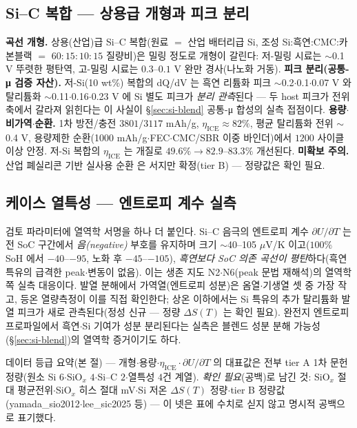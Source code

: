 \subsection{Si--C 복합 --- 상용급 개형과 피크 분리}\label{ssec:si-sic}
\textbf{곡선 개형.} 상용(산업)급 Si--C 복합(원료 $=$ 산업 배터리급 Si, 조성 Si:흑연:CMC:카본블랙 $=$
$60{:}15{:}10{:}15$ 질량비)은 밀링 정도로 개형이 갈린다: 저-밀링 시료는 $\sim$0.1 V 뚜렷한 평탄역, 고-밀링
시료는 $0.3$--$0.1$ V 완만 경사(나노화 거동)\cite{andersen_sic2019}. \textbf{피크 분리(공통-μ 검증
자산).} 저-Si(10 wt\%) 복합의 dQ/dV 는 흑연 리튬화 피크 $\sim$0.2$\cdot$0.1$\cdot$0.07 V 와 탈리튬화
$\sim$0.11$\cdot$0.16$\cdot$0.23 V 에 Si 별도 피크가 \emph{분리 관측}된다\cite{naboka_sic2021} --- 두 host
피크가 전위축에서 갈라져 읽힌다는 이 사실이 \S\ref{sec:si-blend} 공통-μ 합성의 실측 접점이다.
\textbf{용량$\cdot$비가역$\cdot$순환.} 1차 방전/충전 $3801/3117$ mAh/g, $\eta_\mathrm{ICE}\approx82\%$,
평균 탈리튬화 전위 $\sim$0.4 V, 용량제한 순환(1000 mAh/g$\cdot$FEC$\cdot$CMC/SBR 이중 바인더)에서 $1200$
사이클 이상 안정\cite{andersen_sic2019}. 저-Si 복합의 $\eta_\mathrm{ICE}$ 는 개질로 $49.6\%\to82.9$--$83.3\%$
개선된다\cite{naboka_sic2021}. \textbf{미확보 주의.} 산업 폐실리콘 기반 실사용 순환\cite{lee_sic2025} 은
서지만 확정(tier B) --- 정량값은 확인 필요.

\subsection{케이스 열특성 --- 엔트로피 계수 실측}\label{ssec:si-thermal}
검토 파라미터에 열역학 서명을 하나 더 붙인다. Si--C 음극의 엔트로피 계수 $\partial U/\partial T$ 는 전 SoC
구간에서 \emph{음(negative)} 부호를 유지하며 크기 $\sim$40--105 $\mu$V/K 이고($100\%$ SoH 에서
$-40$--$-95$, 노화 후 $-45$--$-105$), \emph{흑연보다 SoC 의존 곡선이 평탄}하다(흑연 특유의 급격한
peak$\cdot$변동이 없음)\cite{bohm_entropy2024}. 이는 생존 지도 N2$\cdot$N6(peak 문법 재해석)의 열역학
쪽 실측 대응이다. 발열 분해에서 가역열(엔트로피 성분)은 옴열$\cdot$기생열 셋 중 가장 작고, 등온 열량측정이
이를 직접 확인한다\cite{arnot_calorimetry2021}; 상온 이하에서는 Si 특유의 추가 탈리튬화 발열 피크가 새로
관측된다\cite{bohm_thermal2025}(정성 신규 --- 정량 $\Delta S(T)$ 는 확인 필요). 완전지 엔트로피
프로파일에서 흑연$\cdot$Si 기여가 성분 분리된다는 실측\cite{wojtala_entropy2022}은 블렌드 성분 분해
가능성(\S\ref{sec:si-blend})의 열역학 증거이기도 하다.
\begin{srcbox}
데이터 등급 요약(본 절) --- 개형$\cdot$용량$\cdot\eta_\mathrm{ICE}\cdot\partial U/\partial T$ 의 대표값은
전부 tier A 1차 문헌 정량(원소 Si $6$$\cdot$SiO$_x$ $4$$\cdot$Si--C $2$$\cdot$열특성 $4$건 계열). \emph{확인
필요}(공백)로 남긴 것: SiO$_x$ 절대 평균전위$\cdot$SiO$_x$ 히스 절대 mV$\cdot$Si 저온 $\Delta S(T)$
정량$\cdot$tier B 정량값(yamada\_sio2012$\cdot$lee\_sic2025 등) --- 이 넷은 표에 수치로 싣지 않고 명시적
공백으로 표기했다.
\end{srcbox}

